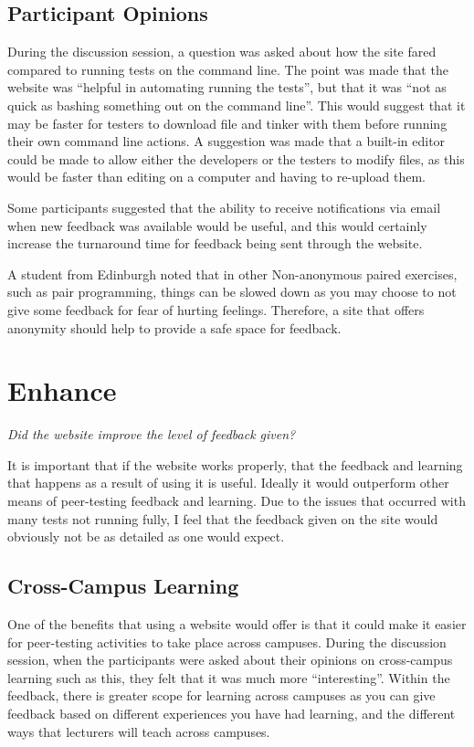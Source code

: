 \documentclass[a4paper,11pt]{report}
\begin{document}
\subsection{Participant Opinions}
During the discussion session, a question was asked about how the site fared compared to running tests on the command line. The point was made that the website was ``helpful in automating running the tests'', but that it was ``not as quick as bashing something out on the command line''. This would suggest that it may be faster for testers to download file and tinker with them before running their own command line actions. A suggestion was made that a built-in editor could be made to allow either the developers or the testers to modify files, as this would be faster than editing on a computer and having to re-upload them.\par
Some participants suggested that the ability to receive notifications via email when new feedback was available would be useful, and this would certainly increase the turnaround time for feedback being sent through the website.\par
A student from Edinburgh noted that in other Non-anonymous paired exercises, such as pair programming, things can be slowed down as you may choose to not give some feedback for fear of hurting feelings. Therefore, a site that offers anonymity should help to provide a safe space for feedback.

\section{Enhance}
\textit{Did the website improve the level of feedback given?}\par
It is important that if the website works properly, that the feedback and learning that happens as a result of using it is useful. Ideally it would outperform other means of peer-testing feedback and learning. Due to the issues that occurred with many tests not running fully, I feel that the feedback given on the site would obviously not be as detailed as one would expect.\par
\subsection{Cross-Campus Learning}
One of the benefits that using a website would offer is that it could make it easier for peer-testing activities to take place across campuses. During the discussion session, when the participants were asked about their opinions on cross-campus learning such as this, they felt that it was much more ``interesting''. Within the feedback,  there is greater scope for learning across campuses as you can give feedback based on different experiences you have had learning, and the different ways that lecturers will teach across campuses.
\end{document}
